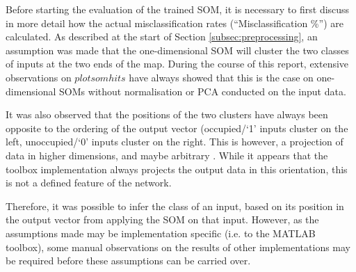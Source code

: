 \documentclass[10pt, oneside]{article}
\begin{document}
Before starting the evaluation of the trained SOM, it is necessary to first discuss in more detail how the actual misclassification rates (``Misclassification \%'') are calculated. As described at the start of Section \ref{subsec:preprocessing}, an assumption was made that the one-dimensional SOM will cluster the two classes of inputs at the two ends of the map. During the course of this report, extensive observations on $plotsomhits$ have always showed that this is the case on one-dimensional SOMs without normalisation or PCA conducted on the input data. 

It was also observed that the positions of the two clusters have always been opposite to the ordering of the output vector (occupied/`1' inputs cluster on the left, unoccupied/`0' inputs cluster on the right. This is however, a projection of data in higher dimensions, and maybe arbitrary \cite[p. 10]{som-app-lecture}. While it appears that the toolbox implementation always projects the output data in this orientation, this is not a defined feature of the network.

Therefore, it was possible to infer the class of an input, based on its position in the output vector from applying the SOM on that input. However, as the assumptions made may be implementation specific (i.e. to the MATLAB toolbox), some manual observations on the results of other implementations may be required before these assumptions can be carried over.


\small{}
\end{document}
